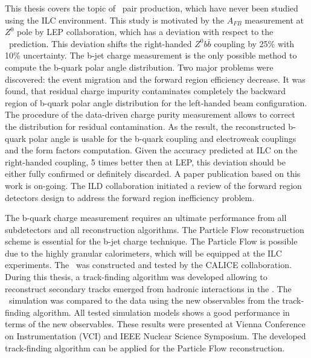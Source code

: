 This thesis covers the topic of \bbbar\ pair production, which have never been studied using the ILC environment. 
This study is motivated by the $A_{FB}$ measurement at $Z^0$ pole by LEP collaboration, which has a deviation with respect to the \sm\ prediction.
This deviation shifts the right-handed $Z^0b\bar{b}$ coupling by 25\% with 10\% uncertainty.
The b-jet charge measurement is the only possible method to compute the b-quark polar angle distribution. 
Two major problems were discovered: the event migration and the forward region efficiency decrease. 
It was found, that residual charge impurity contaminates completely the backward region of b-quark polar angle distribution for the left-handed beam configuration.
The procedure of the data-driven charge purity measurement allows to correct the distribution for residual contamination. 
As the result, the reconstructed b-quark polar angle is usable for the b-quark coupling and electroweak couplings and the form factors computation. 
Given the accuracy predicted at ILC on the right-handed coupling, 5 times better then at LEP, this deviation should be either fully confirmed or definitely discarded. 
A paper publication based on this work is on-going.
The ILD collaboration initiated a review of the forward region detectors design to address the forward region inefficiency problem.

The b-quark charge measurement requires an ultimate performance from all subdetectors and all reconstruction algorithms. The Particle Flow reconstruction scheme is essential for the b-jet charge technique.
The Particle Flow is possible due to the highly granular calorimeters, which will be equipped at the ILC experiments. 
The \ecalp\ was constructed and tested by the CALICE collaboration. 
During this thesis, a track-finding algorithm was developed allowing to reconstruct secondary tracks emerged from hadronic interactions in the \ecalp.
The \ecalp\ simulation was compared to the data using the new observables from the track-finding algorithm. 
All tested simulation models shows a good performance in terms of the new observables. 
These results were presented at Vienna Conference on Instrumentation (VCI) and IEEE Nuclear Science Symposium.
The developed track-finding algorithm can be applied for the Particle Flow reconstruction. 